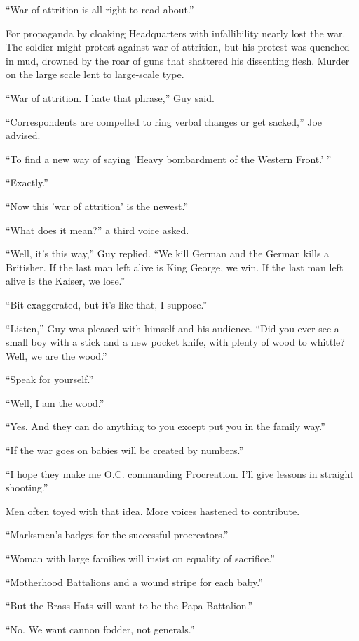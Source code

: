 ``War of attrition is all right to read about.''

For propaganda by cloaking Headquarters with infallibility nearly lost the war. The soldier might protest against war of attrition, but his protest was quenched in mud, drowned by the roar of guns that shattered his dissenting flesh. Murder on the large scale lent to large-scale type.

``War of attrition. I hate that phrase,'' Guy said.

``Correspondents are compelled to ring verbal changes or get sacked,'' Joe advised.

``To find a new way of saying 'Heavy bombardment of the Western Front.' ''

``Exactly.''

``Now this 'war of attrition' is the newest.''

``What does it mean?'' a third voice asked.

``Well, it's this way,'' Guy replied. ``We kill German and the German kills a Britisher. If the last man left alive is King George, we win. If the last man left alive is the Kaiser, we lose.''

``Bit exaggerated, but it's like that, I suppose.''

``Listen,'' Guy was pleased with himself and his audience. ``Did you ever see a small boy with a stick and a new pocket knife, with plenty of wood to whittle? Well, we are the wood.''

``Speak for yourself.''

``Well, I am the wood.''

``Yes. And they can do anything to you except put you in the family way.''

``If the war goes on babies will be created by numbers.''

``I hope they make me O.C. commanding Procreation. I'll give lessons in straight shooting.''

Men often toyed with that idea. More voices hastened to contribute.

``Marksmen's badges for the successful procreators.''

``Woman with large families will insist on equality of sacrifice.''

``Motherhood Battalions and a wound stripe for each baby.''

``But the Brass Hats will want to be the Papa Battalion.''

``No. We want cannon fodder, not generals.''

